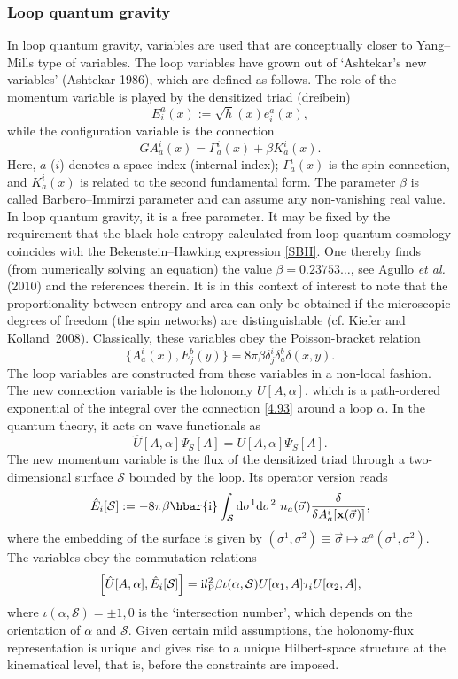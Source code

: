 \documentclass[12pt]{article}
\newcommand{\be}{\begin{equation}}
\newcommand{\ee}{\end{equation}}
\newcommand{\lb}{\label}
\newcommand{\bdm}{\begin{displaymath}}
\newcommand{\edm}{\end{displaymath}}
\newcommand{\D}{{\rm d}}
\newcommand{\I}{{\rm i}}
\newcommand{\X}{{\mathbf x}}
\begin{document}
\subsubsection{Loop quantum gravity}

In loop quantum gravity, variables are used 
that are conceptually closer to Yang--Mills type of
variables. 
The loop variables have grown out of `Ashtekar's new variables'
(Ashtekar 1986), which
are defined as follows.
The role of the momentum variable 
is played by the densitized triad (dreibein)
\be
\lb{4.79}
E^a_i(x):=\sqrt{h}(x)e^a_i(x),
\ee
while the configuration variable is the connection
\be
\lb{4.93}
GA^i_a(x)=\Gamma^i_a(x)+\beta K^i_a(x).
\ee
Here, $a$ ($i$) denotes a space index (internal index);
$\Gamma^i_a(x)$ is the spin connection, and $K^i_a(x)$ is related to
the second fundamental form. The parameter $\beta$ is called
Barbero--Immirzi parameter and can assume any non-vanishing real
value. In loop quantum gravity, it is a free parameter. It may be
fixed by the requirement that the black-hole entropy calculated from
loop quantum cosmology coincides with the Bekenstein--Hawking
expression \eqref{SBH}. One thereby finds (from numerically solving an
equation) the
value $\beta=0.23753\ldots$, see Agullo {\em et al.} (2010) and the
references therein. It is in this context of interest to note that the
proportionality between entropy and area can only be obtained if the
microscopic degrees of freedom (the spin networks) are distinguishable 
(cf. Kiefer and Kolland~2008).
Classically, these variables obey the Poisson-bracket relation
\be
\lb{4.94}
\{A^i_a(x),E^b_j(y)\}=8\pi\beta\delta^i_j\delta^b_a\delta(x,y).
\ee
The loop variables are constructed from these variables in a non-local
fashion. The new connection variable is the holonomy $U[A,\alpha]$,
which is a path-ordered exponential of the integral over the
connection \eqref{4.93} around a loop $\alpha$. In the quantum theory,
it acts on wave functionals as
\be
\lb{6.20}
\hat{U}[A,\alpha]\Psi_S[A]= U[A,\alpha]\Psi_S[A].
\ee
The new momentum variable is the flux of the densitized triad through
a two-dimensional surface ${\mathcal S}$ 
bounded by the loop. Its operator version reads
\be
\lb{6.21}
\hat{E}_i[{\mathcal S}]:= -8\pi\beta\hbar\I\int_{\mathcal S}\D\sigma^1
\D\sigma^2\ n_a(\vec{\sigma})\frac{\delta}{\delta A^i_a[\X(\vec{\sigma})]},
\ee
where the embedding of the surface is given by
$(\sigma^1,\sigma^2)\equiv\vec{\sigma} 
\mapsto x^a(\sigma^1,\sigma^2)$. 
The variables obey the commutation relations
\bdm
\left[\hat{U}[A,\alpha],\hat{E}_i[{\mathcal S}]\right]
=\I l_{\rm P}^2\beta\iota(\alpha,{\mathcal S})U[\alpha_1,A]\tau_i
U[\alpha_2,A],
\edm
where $\iota(\alpha,{\mathcal S})=\pm 1, 0$ is the `intersection number',
which depends on the orientation of $\alpha$ and ${\mathcal S}$.
Given certain mild assumptions, the holonomy-flux representation is
unique and gives rise to a unique Hilbert-space structure at the
kinematical level, that is, before the constraints are imposed. 
\end{document}
